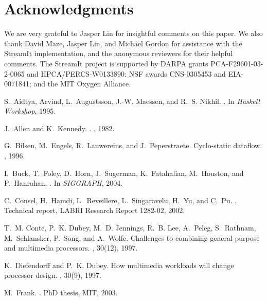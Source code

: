 \documentclass{sig-alternate}
\begin{document}
\section{Acknowledgments}

We are very grateful to Jasper Lin for insightful comments on this
paper.  We also thank David Maze, Jasper Lin, and Michael Gordon for
assistance with the StreamIt implementation, and the anonymous
reviewers for their helpful comments.  The StreamIt project is
supported by DARPA grants PCA-F29601-03-2-0065 and
HPCA/PERCS-W0133890; NSF awards CNS-0305453 and EIA-0071841; and the
MIT Oxygen Alliance.


{\small
%  
%  
\begin{thebibliography}{10}

S.~Aidtya, Arvind, L.~Augustsson, J.-W. Maessen, and R.~S. Nikhil.
.
\newblock In {\em Haskell Workshop}, 1995.

J.~Allen and K.~Kennedy.
.
, 1982.

G.~Bilsen, M.~Engels, R.~Lauwereins, and J.~Peperstraete.
\newblock Cyclo-static dataflow.
, 1996.

I.~Buck, T.~Foley, D.~Horn, J.~Sugerman, K.~Fatahalian, M.~Houston, and
  P.~Hanrahan.
.
\newblock In {\em SIGGRAPH}, 2004.

C.~Consel, H.~Hamdi, L.~Reveillere, L.~Singaravelu, H.~Yu, and C.~Pu.
.
\newblock Technical report, LABRI Research Report 1282-02, 2002.

T.~M. Conte, P.~K. Dubey, M.~D. Jennings, R.~B. Lee, A.~Peleg, S.~Rathnam,
  M.~Schlansker, P.~Song, and A.~Wolfe.
\newblock Challenges to combining general-purpose and multimedia processors.
, 30(12), 1997.

K.~Diefendorff and P.~K. Dubey.
\newblock How multimedia workloads will change processor design.
, 30(9), 1997.

M.~Frank.
.
\newblock PhD thesis, MIT, 2003.


\end{thebibliography}}
\end{document}
